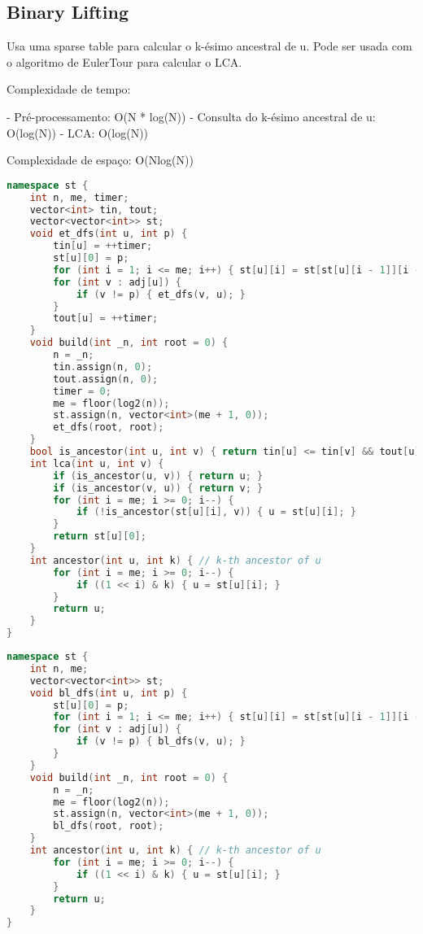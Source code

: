 \documentclass[11pt, a4paper, twoside]{article}
\begin{document}
\subsection{Binary Lifting}


Usa uma sparse table para calcular o k-ésimo ancestral de u.
Pode ser usada com o algoritmo de EulerTour para calcular o LCA.

Complexidade de tempo:

- Pré-processamento: O(N * log(N))
- Consulta do k-ésimo ancestral de u: O(log(N))
- LCA: O(log(N))

Complexidade de espaço: O(Nlog(N))

\begin{lstlisting}[language=C++]
namespace st {
    int n, me, timer;
    vector<int> tin, tout;
    vector<vector<int>> st;
    void et_dfs(int u, int p) {
        tin[u] = ++timer;
        st[u][0] = p;
        for (int i = 1; i <= me; i++) { st[u][i] = st[st[u][i - 1]][i - 1]; }
        for (int v : adj[u]) {
            if (v != p) { et_dfs(v, u); }
        }
        tout[u] = ++timer;
    }
    void build(int _n, int root = 0) {
        n = _n;
        tin.assign(n, 0);
        tout.assign(n, 0);
        timer = 0;
        me = floor(log2(n));
        st.assign(n, vector<int>(me + 1, 0));
        et_dfs(root, root);
    }
    bool is_ancestor(int u, int v) { return tin[u] <= tin[v] && tout[u] >= tout[v]; }
    int lca(int u, int v) {
        if (is_ancestor(u, v)) { return u; }
        if (is_ancestor(v, u)) { return v; }
        for (int i = me; i >= 0; i--) {
            if (!is_ancestor(st[u][i], v)) { u = st[u][i]; }
        }
        return st[u][0];
    }
    int ancestor(int u, int k) { // k-th ancestor of u
        for (int i = me; i >= 0; i--) {
            if ((1 << i) & k) { u = st[u][i]; }
        }
        return u;
    }
}
\end{lstlisting}

\begin{lstlisting}[language=C++]
namespace st {
    int n, me;
    vector<vector<int>> st;
    void bl_dfs(int u, int p) {
        st[u][0] = p;
        for (int i = 1; i <= me; i++) { st[u][i] = st[st[u][i - 1]][i - 1]; }
        for (int v : adj[u]) {
            if (v != p) { bl_dfs(v, u); }
        }
    }
    void build(int _n, int root = 0) {
        n = _n;
        me = floor(log2(n));
        st.assign(n, vector<int>(me + 1, 0));
        bl_dfs(root, root);
    }
    int ancestor(int u, int k) { // k-th ancestor of u
        for (int i = me; i >= 0; i--) {
            if ((1 << i) & k) { u = st[u][i]; }
        }
        return u;
    }
}
\end{lstlisting}
\end{document}
